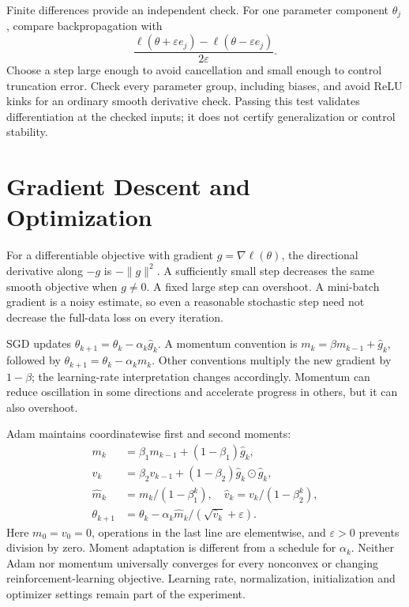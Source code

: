 Finite differences provide an independent check. For one parameter component $\theta_j$, compare backpropagation with
\begin{equation}
\frac{\ell(\theta+\varepsilon e_j)-\ell(\theta-\varepsilon e_j)}{2\varepsilon}.
\end{equation}
Choose a step large enough to avoid cancellation and small enough to control truncation error. Check every parameter group, including biases, and avoid ReLU kinks for an ordinary smooth derivative check. Passing this test validates differentiation at the checked inputs; it does not certify generalization or control stability.

\section{Gradient Descent and Optimization}

For a differentiable objective with gradient $g=\nabla\ell(\theta)$, the directional derivative along $-g$ is $-\|g\|^2$. A sufficiently small step decreases the same smooth objective when $g\ne0$. A fixed large step can overshoot. A mini-batch gradient is a noisy estimate, so even a reasonable stochastic step need not decrease the full-data loss on every iteration.

SGD updates $\theta_{k+1}=\theta_k-\alpha_k\hat g_k$. A momentum convention is $m_k=\beta m_{k-1}+\hat g_k$, followed by $\theta_{k+1}=\theta_k-\alpha_km_k$. Other conventions multiply the new gradient by $1-\beta$; the learning-rate interpretation changes accordingly. Momentum can reduce oscillation in some directions and accelerate progress in others, but it can also overshoot.

Adam maintains coordinatewise first and second moments:
\begin{equation}
\begin{aligned}
m_k&=\beta_1m_{k-1}+(1-\beta_1)\hat g_k,\\
v_k&=\beta_2v_{k-1}+(1-\beta_2)\hat g_k\odot\hat g_k,\\
\hat m_k&=m_k/(1-\beta_1^k),\quad
\hat v_k=v_k/(1-\beta_2^k),\\
\theta_{k+1}&=\theta_k-\alpha_k\hat m_k/(\sqrt{\hat v_k}+\varepsilon).
\end{aligned}
\end{equation}
Here $m_0=v_0=0$, operations in the last line are elementwise, and $\varepsilon>0$ prevents division by zero. Moment adaptation is different from a schedule for $\alpha_k$. Neither Adam nor momentum universally converges for every nonconvex or changing reinforcement-learning objective. Learning rate, normalization, initialization and optimizer settings remain part of the experiment.

